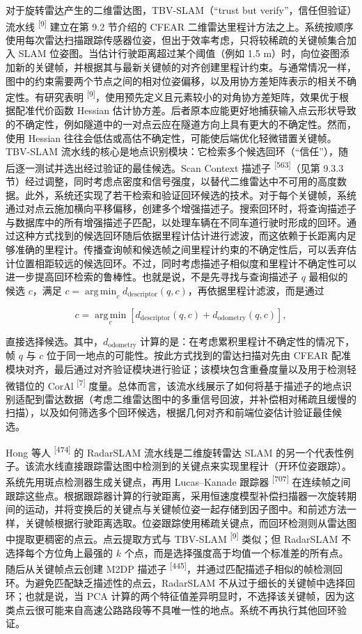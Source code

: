 对于旋转雷达产生的二维雷达图，TBV-SLAM（“trust but verify”，信任但验证）流水线 \textsuperscript{[9]} 建立在第 9.2 节介绍的 CFEAR 二维雷达里程计方法之上。系统按顺序使用每次雷达扫描跟踪传感器位姿，但出于效率考虑，只将较稀疏的关键帧集合加入 SLAM 位姿图。当估计行驶距离超过某个阈值（例如 1.5 m）时，向位姿图添加新的关键帧，并根据其与最新关键帧的对齐创建里程计约束。与通常情况一样，图中的约束需要两个节点之间的相对位姿偏移，以及用协方差矩阵表示的相关不确定性。有研究表明 \textsuperscript{[9]}，使用预先定义且元素较小的对角协方差矩阵，效果优于根据配准代价函数 Hessian 估计协方差。后者原本应能更好地捕获输入点云形状导致的不确定性，例如隧道中的一对点云应在隧道方向上具有更大的不确定性。然而，使用 Hessian 往往会低估或高估不确定性，可能使后端优化轻微错置关键帧。TBV-SLAM 流水线的核心是地点识别模块：它检索多个候选回环（“信任”），随后逐一测试并选出经过验证的最佳候选。Scan Context 描述子 \textsuperscript{[563]}（见第 9.3.3 节）经过调整，同时考虑点密度和信号强度，以替代二维雷达中不可用的高度数据。此外，系统还实现了若干检索和验证回环候选的技术。对于每个关键帧，系统通过对点云施加横向平移偏移，创建多个增强描述子。搜索回环时，将查询描述子与数据库中的所有增强描述子匹配，以处理车辆在不同车道行驶时形成的回环。通过这种方式找到的候选回环随后依据里程计估计进行滤波，而这依赖于长距离内足够准确的里程计。传播查询帧和候选帧之间里程计约束的不确定性后，可以丢弃估计位置相距较远的候选回环。不过，同时考虑描述子相似度和里程计不确定性可以进一步提高回环检索的鲁棒性。也就是说，不是先寻找与查询描述子 $q$ 最相似的候选 $c$，满足 $c = \operatorname*{arg\,min}_{c} d_{\mathrm{descriptor}}(q,c)$，再依据里程计滤波，而是通过

\begin{equation*}
c = \operatorname*{arg\,min}_{c}\left[d_{\mathrm{descriptor}}(q,c)+d_{\mathrm{odometry}}(q,c)\right],
\end{equation*}

直接选择候选。其中，$d_{\mathrm{odometry}}$ 计算的是：在考虑累积里程计不确定性的情况下，帧 $q$ 与 $c$ 位于同一地点的可能性。按此方式找到的雷达扫描对先由 CFEAR 配准模块对齐，最后通过对齐验证模块进行验证；该模块包含重叠度量以及用于检测轻微错位的 CorAl \textsuperscript{[7]} 度量。总体而言，该流水线展示了如何将基于描述子的地点识别适配到雷达数据（考虑二维雷达图中的多重信号回波，并补偿相对稀疏且缓慢的扫描），以及如何筛选多个回环候选，根据几何对齐和前端位姿估计验证最佳候选。

Hong 等人 \textsuperscript{[474]} 的 RadarSLAM 流水线是二维旋转雷达 SLAM 的另一个代表性例子。该流水线直接跟踪雷达图中检测到的关键点来实现里程计（开环位姿跟踪）。系统先用斑点检测器生成关键点，再用 Lucas--Kanade 跟踪器 \textsuperscript{[707]} 在连续帧之间跟踪这些点。根据跟踪器计算的行驶距离，采用恒速度模型补偿扫描器一次旋转期间的运动，并将变换后的关键点与关键帧位姿一起存储到因子图中。和前述方法一样，关键帧根据行驶距离选取。位姿跟踪使用稀疏关键点，而回环检测则从雷达图中提取更稠密的点云。点云提取方式与 TBV-SLAM \textsuperscript{[9]} 类似；但 RadarSLAM 不选择每个方位角上最强的 $k$ 个点，而是选择强度高于均值一个标准差的所有点。随后从关键帧点云创建 M2DP 描述子 \textsuperscript{[445]}，并通过匹配描述子相似的帧检测回环。为避免匹配缺乏描述性的点云，RadarSLAM 不从过于细长的关键帧中选择回环；也就是说，当 PCA 计算的两个特征值差异明显时，不选择该关键帧，因为这类点云很可能来自高速公路路段等不具唯一性的地点。系统不再执行其他回环验证。

